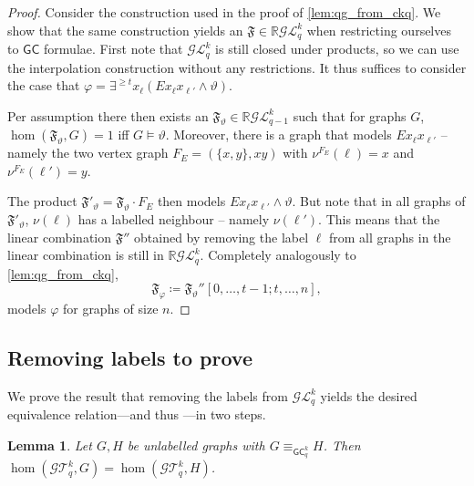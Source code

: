 \documentclass[10pt,a4paper]{article}
\newtheorem{lemma}[theorem]{Lemma}
\renewcommand{\theta}{\vartheta}
\newcommand{\R}{\ensuremath{\mathbb{R}}}
\newcommand{\Ekq}{\ensuremath{\mathcal{T}_{q}^{k}}}
\newcommand{\Lkq}{\ensuremath{\mathcal{L}_{q}^{k}}}
\newcommand{\LParam}[2]{\ensuremath{\mathcal{L}_{#2}^{#1}}}
\newcommand{\GEkq}{\ensuremath{\mathcal{G}\Lkq}}
\newcommand{\GEParam}[2]{\ensuremath{\mathcal{G}\LParam{#1}{#2}}}
\newcommand{\GEkqLL}{\ensuremath{\mathcal{G}\Ekq}}
\newcommand{\lGC}{\ensuremath{\mathsf{GC}}}
\newcommand{\qg}[1]{\ensuremath{\mathfrak{#1}}} \newcommand{\qgp}[3]{\ensuremath{\mathfrak{#1}[#3; #2]}}
\begin{document}
  \begin{proof}
    Consider the construction used in the proof of \cref{lem:qg_from_ckq}. We show that the same construction yields an $\qg{F} \in \R\GEkq$ when restricting ourselves to $\lGC$ formulae. First note that $\GEkq$ is still closed under products, so we can use the interpolation construction without any restrictions. It thus suffices to consider the case that $\varphi = \exists^{\geq t} x_\ell (Ex_{\ell}x_{\ell'} \land \theta)$.

    Per assumption there then exists an $\qg{F_\theta} \in \R\GEParam{k}{q-1}$ such that for graphs $G$, $\hom(\qg{F_\theta}, G) = 1$ iff $G \models \theta$. Moreover, there is a graph that models $Ex_{\ell}x_{\ell'}$ -- namely the two vertex graph $F_E = (\{x, y\}, {xy})$ with $\nu^{F_E}(\ell) = x$ and $\nu^{F_E}(\ell') = y$.

    The product $\qg{F'_\theta} = \qg{F}_\theta \cdot F_E$ then models $Ex_{\ell}x_{\ell'} \land \theta$. But note that in all graphs of $\qg{F'_\theta}$, $\nu(\ell)$ has a labelled neighbour -- namely $\nu(\ell')$. This means that the linear combination $\qg{F''}$ obtained by removing the label $\ell$ from all graphs in the linear combination is still in $\R\GEkq$. Completely analogously to \cref{lem:qg_from_ckq},
    \begin{equation*}
      \qg{F_\varphi} \coloneqq \qgp{F_\theta''}{t, \dots, n}{0, \dots, t-1},
    \end{equation*}
    models $\varphi$ for graphs of size $n$.
  \end{proof}

  \subsection{Removing labels to prove }

  We prove the result that removing the labels from $\GEkq$ yields the desired equivalence relation---and thus ---in two steps.


  \begin{lemma}\label{lem:labelsFw}
  Let $G, H$ be unlabelled graphs with $G \equiv_{\lGC^k_q} H$. Then $\hom(\GEkqLL, G) = \hom(\GEkqLL, H)$.
\end{lemma}
\end{document}

